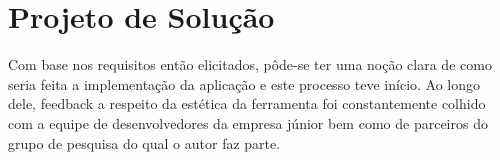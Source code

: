 \chapter{Projeto de Solução}

Com base nos requisitos então elicitados, pôde-se ter uma noção clara de como seria feita a implementação da aplicação e este processo teve início. Ao longo dele, feedback a respeito da estética da ferramenta foi constantemente colhido com a equipe de desenvolvedores da empresa júnior bem como de parceiros do grupo de pesquisa do qual o autor faz parte.





